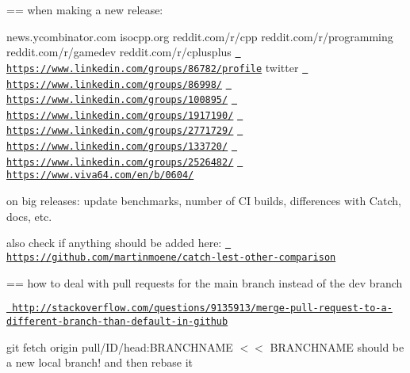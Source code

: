 == when making a new release\+:

news.\+ycombinator.\+com isocpp.\+org reddit.\+com/r/cpp reddit.\+com/r/programming reddit.\+com/r/gamedev reddit.\+com/r/cplusplus \href{https://www.linkedin.com/groups/86782/profile}{\texttt{ https\+://www.\+linkedin.\+com/groups/86782/profile}} twitter \href{https://www.linkedin.com/groups/86998/}{\texttt{ https\+://www.\+linkedin.\+com/groups/86998/}} \href{https://www.linkedin.com/groups/100895/}{\texttt{ https\+://www.\+linkedin.\+com/groups/100895/}} \href{https://www.linkedin.com/groups/1917190/}{\texttt{ https\+://www.\+linkedin.\+com/groups/1917190/}} \href{https://www.linkedin.com/groups/2771729/}{\texttt{ https\+://www.\+linkedin.\+com/groups/2771729/}} \href{https://www.linkedin.com/groups/133720/}{\texttt{ https\+://www.\+linkedin.\+com/groups/133720/}} \href{https://www.linkedin.com/groups/2526482/}{\texttt{ https\+://www.\+linkedin.\+com/groups/2526482/}} \href{https://www.viva64.com/en/b/0604/}{\texttt{ https\+://www.\+viva64.\+com/en/b/0604/}}

on big releases\+: update benchmarks, number of CI builds, differences with Catch, docs, etc.

also check if anything should be added here\+: \href{https://github.com/martinmoene/catch-lest-other-comparison}{\texttt{ https\+://github.\+com/martinmoene/catch-\/lest-\/other-\/comparison}}

== how to deal with pull requests for the main branch instead of the dev branch
\begin{DoxyItemize}
\item \href{http://stackoverflow.com/questions/9135913/merge-pull-request-to-a-different-branch-than-default-in-github}{\texttt{ http\+://stackoverflow.\+com/questions/9135913/merge-\/pull-\/request-\/to-\/a-\/different-\/branch-\/than-\/default-\/in-\/github}}
\item git fetch origin pull/\+I\+D/head\+:B\+R\+A\+N\+C\+H\+N\+A\+ME $<$$<$ B\+R\+A\+N\+C\+H\+N\+A\+ME should be a new local branch! and then rebase it
\end{DoxyItemize}

